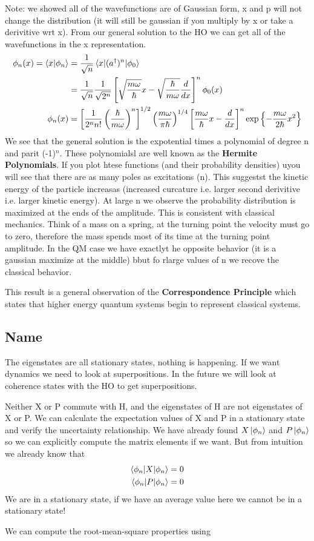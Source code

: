 \documentclass{article}
\newcommand{\be}{\begin{equation}}
\newcommand{\ee}{\end{equation}}
\newcommand{\dg}{\dagger}
\begin{document}
Note: we showed all of the wavefunctions are of Gaussian form, x and p will not change the distribution (it will still be gaussian if you multiply by x or take a derivitive wrt x). 
From our general solution to the HO we can get all of the wavefunctions in the x representation. 
\be
\begin{split}
    \phi_n(x) = \braket{x|\phi_n} &= \frac{1}{\sqrt{n}} \braket{x|(a^\dg)^n|\phi_0}\\
    &= \frac{1}{\sqrt{n}} \frac{1}{\sqrt{2^n}}\left[ \sqrt{\frac{m\omega}{\hbar}}x - \sqrt{\frac{\hbar}{m\omega}}\frac{d}{dx} \right]^n \phi_0(x)\\
    \phi_n(x) &= \left[ \frac{1}{2^nn!} \left(\frac{\hbar}{m\omega}\right)^n \right]^{1/2} \left(\frac{m\omega}{\pi \hbar}\right)^{1/4} \left[ \frac{m\omega}{\hbar}x-\frac{d}{dx} \right]^n \text{exp} \left\{-\frac{m\omega}{2\hbar}x^2\right\}
\end{split}
\ee
We see that the general solution is the expotential times a polynomial of degree n and parit (-1)$^n$.
These polynomialsl are well known as the \textbf{Hermite Polynomials}. 
If you plot htese functions (and their probability densities) uyou will see that there are as many poles as excitations (n).
This suggestst the kinetic energy of the particle increasas (increased curcature i.e. larger second derivitive i.e. larger kinetic energy). 
At large n we observe the probability distribution is maximized at the ends of the amplitude.
This is consistent with classical mechanics.
Think of a mass on a spring, at the turning point the velocity must go to zero, therefore the mass spends most of its time at the turning point amplitude. 
In the QM case we have exactlyt he opposite behavior (it is a gaussian maximize at the middle) bbut fo rlarge values of n we recove the classical behavior. 

This result is a general observation of the \textbf{Correspondence Principle} which states that higher energy quantum systems begin to represent classical systems. 

\subsection*{Name}
The eigenstates are all stationary states, nothing is happening.
If we want dynamics we need to look at superpositions. 
In the future we will look at coherence states with the HO to get superpositions.

Neither X or P commute with H, and the eigenstates of H are not eigenstates of X or P. 
We can calculate the expectation values of X and P in a stationary state and verify the uncertainty relationship.
We have already found $X\ket{\phi_n}$ and $P\ket{\phi_n}$ so we can explicitly compute the matrix elements if we want.
But from intuition we already know that
\be
\begin{split}
    \braket{\phi_n|X|\phi_n} &= 0\\
    \braket{\phi_n|P|\phi_n} &= 0
    \end{split}
    \ee
We are in a stationary state, if we have an average value here we cannot be in a stationary state!

We can compute the root-mean-square properties using
\end{document}
